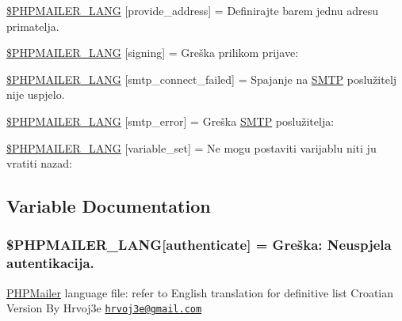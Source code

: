 \begin{DoxyCompactItemize}
\hyperlink{phpmailer_8lang-hr_8php_a8b97897c2406b7392b056f375feeefbb}{\$\+P\+H\+P\+M\+A\+I\+L\+E\+R\+\_\+\+L\+A\+NG} \mbox{[}\textquotesingle{}provide\+\_\+address\textquotesingle{}\mbox{]} = \textquotesingle{}Definirajte barem jednu adresu primatelja.\textquotesingle{}
\item 
\hyperlink{phpmailer_8lang-hr_8php_a68e437bdb9b968a5a67320f03d231565}{\$\+P\+H\+P\+M\+A\+I\+L\+E\+R\+\_\+\+L\+A\+NG} \mbox{[}\textquotesingle{}signing\textquotesingle{}\mbox{]} = \textquotesingle{}Greška prilikom prijave\+: \textquotesingle{}
\item 
\hyperlink{phpmailer_8lang-hr_8php_a7b321d4ca1e9df702403ed4c61aa0980}{\$\+P\+H\+P\+M\+A\+I\+L\+E\+R\+\_\+\+L\+A\+NG} \mbox{[}\textquotesingle{}smtp\+\_\+connect\+\_\+failed\textquotesingle{}\mbox{]} = \textquotesingle{}Spajanje na \hyperlink{class_s_m_t_p}{S\+M\+TP} poslužitelj nije uspjelo.\textquotesingle{}
\item 
\hyperlink{phpmailer_8lang-hr_8php_a7d9cffba1e669c845f8a4c891ee50064}{\$\+P\+H\+P\+M\+A\+I\+L\+E\+R\+\_\+\+L\+A\+NG} \mbox{[}\textquotesingle{}smtp\+\_\+error\textquotesingle{}\mbox{]} = \textquotesingle{}Greška \hyperlink{class_s_m_t_p}{S\+M\+TP} poslužitelja\+: \textquotesingle{}
\item 
\hyperlink{phpmailer_8lang-hr_8php_af795debc7a739d038742691c358d9032}{\$\+P\+H\+P\+M\+A\+I\+L\+E\+R\+\_\+\+L\+A\+NG} \mbox{[}\textquotesingle{}variable\+\_\+set\textquotesingle{}\mbox{]} = \textquotesingle{}Ne mogu postaviti varijablu niti ju vratiti nazad\+: \textquotesingle{}
\end{DoxyCompactItemize}


\subsection{Variable Documentation}
\subsubsection[{\texorpdfstring{\$\+P\+H\+P\+M\+A\+I\+L\+E\+R\+\_\+\+L\+A\+NG}{$PHPMAILER_LANG}}]{\setlength{\rightskip}{0pt plus 5cm}\$P\+H\+P\+M\+A\+I\+L\+E\+R\+\_\+\+L\+A\+NG\mbox{[}\textquotesingle{}authenticate\textquotesingle{}\mbox{]} =  Greška\+: Neuspjela autentikacija.\textquotesingle{}}\hypertarget{phpmailer_8lang-hr_8php_a2cb33073c989b85580748e331ed8b4aa}{}\label{phpmailer_8lang-hr_8php_a2cb33073c989b85580748e331ed8b4aa}
\hyperlink{class_p_h_p_mailer}{P\+H\+P\+Mailer} language file\+: refer to English translation for definitive list Croatian Version By Hrvoj3e \href{mailto:hrvoj3e@gmail.com}{\tt hrvoj3e@gmail.\+com} 

